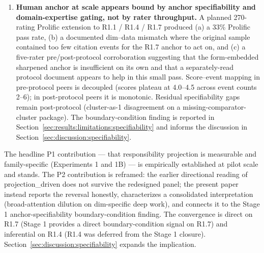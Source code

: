 \begin{enumerate}
    \item \textbf{Human anchor at scale appears bound by anchor specifiability and domain-expertise gating, not by rater throughput.} A planned 270-rating Prolific extension to R1.1 / R1.4 / R1.7 produced (a) a 33\% Prolific pass rate, (b) a documented dim--data mismatch where the original sample contained too few citation events for the R1.7 anchor to act on, and (c) a five-rater pre/post-protocol corroboration suggesting that the form-embedded sharpened anchor is insufficient on its own and that a separately-read protocol document appears to help in this small pass. Score--event mapping in pre-protocol peers is decoupled (scores plateau at 4.0--4.5 across event counts 2--6); in post-protocol peers it is monotonic. Residual specifiability gaps remain post-protocol (cluster-as-1 disagreement on a missing-comparator-cluster package). The boundary-condition finding is reported in Section~\ref{sec:results:limitations:specifiability} and informs the discussion in Section~\ref{sec:discussion:specifiability}.
\end{enumerate}

The headline P1 contribution --- that responsibility projection is measurable and family-specific (Experiments 1 and 1B) --- is empirically established at pilot scale and stands. The P2 contribution is reframed: the earlier directional reading of projection\_driven does not survive the redesigned panel; the present paper instead reports the reversal honestly, characterizes a consolidated interpretation (broad-attention dilution on dim-specific deep work), and connects it to the Stage 1 anchor-specifiability boundary-condition finding. The convergence is direct on R1.7 (Stage 1 provides a direct boundary-condition signal on R1.7) and inferential on R1.4 (R1.4 was deferred from the Stage 1 closure). Section~\ref{sec:discussion:specifiability} expands the implication.
